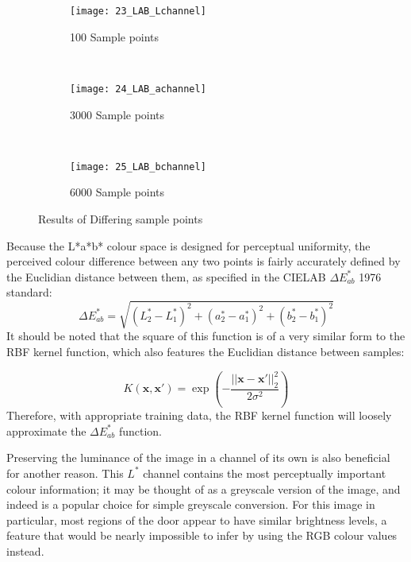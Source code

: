 \begin{figure}[h]
        \centering
        \begin{subfigure}[b]{0.3\textwidth}
                \centering
                \texttt{[image: 23\_LAB\_Lchannel]}
                \caption{100 Sample points}
                \label{fig:23_LAB_Lchannel}
        \end{subfigure}%
        ~ %
        \begin{subfigure}[b]{0.3\textwidth}
                \centering

                \texttt{[image: 24\_LAB\_achannel]}
                \caption{3000 Sample points}
                \label{fig:24_LAB_achannel}     
        \end{subfigure}
        ~
        \begin{subfigure}[b]{0.3\textwidth}
                \centering

                \texttt{[image: 25\_LAB\_bchannel]}
                \caption{6000 Sample points}
                \label{fig:25_LAB_bchannel}     
        \end{subfigure}
        \caption{Results of Differing sample points}\label{fig:labchannels}
\end{figure}

Because the L*a*b* colour space is designed for perceptual uniformity, the perceived colour difference between any two points is fairly accurately defined by the Euclidian distance between them, as specified in the CIELAB $\Delta E_{ab}^*$ 1976 standard:
\begin{equation}
\Delta E_{ab}^* = \sqrt{ (L^*_2-L^*_1)^2+(a^*_2-a^*_1)^2 + (b^*_2-b^*_1)^2 }
\end{equation}
It should be noted that the square of this function is of a very similar form to the RBF kernel function, which also features the Euclidian distance between samples:

\begin{equation}
K(\mathbf{x}, \mathbf{x'}) = \exp\left(-\frac{||\mathbf{x} - \mathbf{x'}||_2^2}{2\sigma^2}\right)
\end{equation}
Therefore, with appropriate training data, the RBF kernel function will loosely approximate the $\Delta E_{ab}^*$ function.

  Preserving the luminance of the image in a channel of its own is also beneficial for another reason. This $L^*$ channel contains the most perceptually important colour information; it may be thought of as a greyscale version of the image, and indeed is a popular choice for simple greyscale conversion. For this image in particular, most regions of the door appear to have similar brightness levels, a feature that would be nearly impossible to infer by using the RGB colour values instead.

